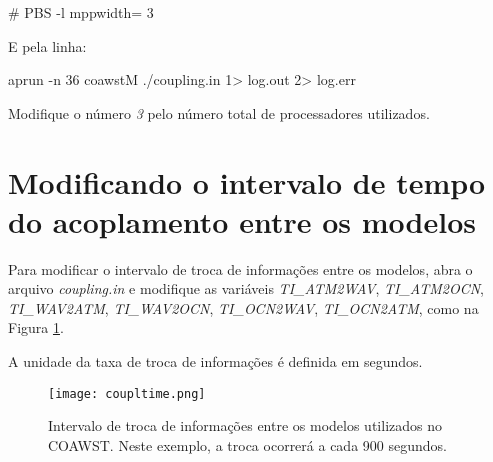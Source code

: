 \begin{bashcode}
\# PBS -l mppwidth= 3
\end{bashcode}
\bigskip

\noindent E pela linha:
\bigskip

\begin{bashcode}
aprun -n 36 coawstM ./coupling.in 1> log.out 2> log.err
\end{bashcode}
\bigskip

\noindent Modifique o número \textit{3} pelo número total de processadores utilizados.
\bigskip

\section{Modificando o intervalo de tempo do acoplamento entre os modelos}
\bigskip

\noindent Para modificar o intervalo de troca de informações entre os modelos, abra o arquivo \textit{coupling.in} e 
          modifique as variáveis \textit{TI\_ATM2WAV}, \textit{TI\_ATM2OCN}, \textit{TI\_WAV2ATM}, \textit{TI\_WAV2OCN}, \textit{TI\_OCN2WAV},
          \textit{TI\_OCN2ATM}, como na Figura \textcolor{bleu_cite}{\ref{taxaacopla}}.
\bigskip

\begin{tcolorbox}[enhanced,
  grow to left by=0cm,%
  grow to right by=0cm,%
  enlarge top by=0cm,%
  enlarge bottom by=0cm,%
  tcbox raise base,
  boxrule=1.0pt,
  left=18mm,
  colframe=red!50!black,coltext=red!25!black,colback=red!10!white,
  overlay={\begin{tcbclipinterior}\fill[red!75!blue!50!white] (frame.south west)
    rectangle node[text=white,font=\sffamily\bfseries\footnotesize,rotate=0] {ATENÇÃO} ([xshift=18mm]frame.north west);\end{tcbclipinterior}}]
A unidade da taxa de troca de informações é definida em segundos.
\end{tcolorbox}
\bigskip

\begin{figure}[H]
    \centering
    \texttt{[image: coupltime.png]}
    \caption{Intervalo de troca de informações entre os modelos utilizados no COAWST. Neste exemplo, a troca ocorrerá a cada 900 segundos.}
    \label{taxaacopla}
\end{figure}
\bigskip
